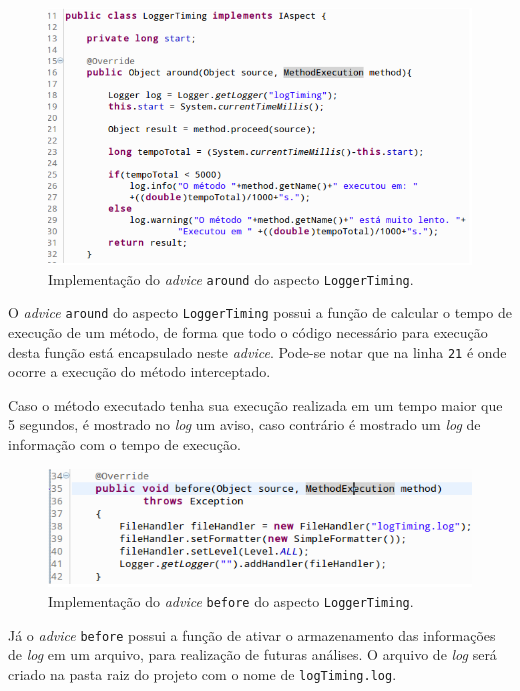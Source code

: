 \documentclass[tc,oneside]{iiufrgs}
\begin{document}
\begin{figure}[ht]
	\centering
	\includegraphics[scale=0.6]{figuras/estudo/loggertimingaround.png}
	\caption{Implementação do \textit{advice} \texttt{around} do aspecto \texttt{LoggerTiming}.}
	\label{fig:loggeraspectaround}
\end{figure}
O \textit{advice} \texttt{around} do aspecto \texttt{LoggerTiming} possui a função de calcular o tempo de execução de um método, de forma que todo o código necessário para execução desta função está encapsulado neste \textit{advice}. Pode-se notar que na linha \texttt{21} é onde ocorre a execução do método interceptado.

Caso o método executado tenha sua execução realizada em um tempo maior que 5 segundos, é mostrado no \textit{log} um aviso, caso contrário é mostrado um \textit{log} de informação com o tempo de execução.

\begin{figure}[ht]
	\centering
	\includegraphics[scale=0.6]{figuras/estudo/loggertimingbefore.png}
	\caption{Implementação do \textit{advice} \texttt{before} do aspecto \texttt{LoggerTiming}.}
	\label{fig:loggeraspectbefore}
\end{figure}

Já o \textit{advice} \texttt{before} possui a função de ativar o armazenamento das informações de \textit{log} em um arquivo, para realização de futuras análises. O arquivo de \textit{log} será criado na pasta raiz do projeto com o nome de \texttt{logTiming.log}.
\end{document}

